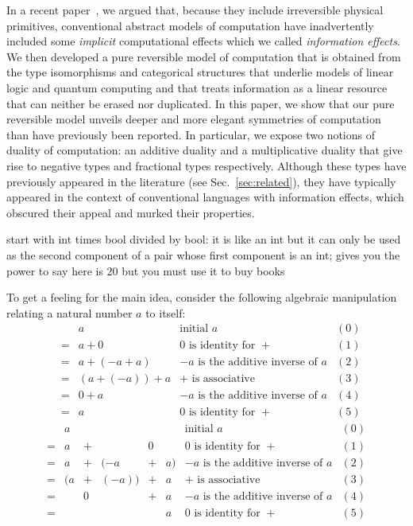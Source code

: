 \documentclass[preprint]{sigplanconf}
\begin{document}
In a recent paper~\cite{infeffects}, we argued that, because they include
irreversible physical primitives, conventional abstract models of computation
have inadvertently included some \emph{implicit} computational effects which
we called \emph{information effects}. We then developed a pure reversible
model of computation that is obtained from the type isomorphisms and
categorical structures that underlie models of linear logic and quantum
computing and that treats information as a linear resource that can neither
be erased nor duplicated. In this paper, we show that our pure reversible
model unveils deeper and more elegant symmetries of computation than have
previously been reported. In particular, we expose two notions of duality of
computation: an additive duality and a multiplicative duality that give rise
to negative types and fractional types respectively. Although these types
have previously appeared in the literature (see Sec.~\ref{sec:related}), they
have typically appeared in the context of conventional languages with
information effects, which obscured their appeal and murked their properties.

start with int times bool divided by bool: it is like an int but it can only
be used as the second component of a pair whose first component is an int;
gives you the power to say here is 20 but you must use it to buy books

To get a feeling for the main idea, consider the following algebraic
manipulation relating a natural number $a$ to itself:
\[\begin{array}{rclll}
&& a & \mbox{initial~$a$} & (0) \\
&=& a + 0 & \mbox{$0$~is~identity~for~$+$} & (1) \\
&=& a + (-a + a) & \mbox{$-a$~is~the~additive~inverse~of~$a$} & (2) \\
&=& (a + (-a)) + a & \mbox{$+$~is~associative} & (3) \\
&=& 0 + a & \mbox{$-a$~is~the~additive~inverse~of~$a$} & (4) \\
&=& a & \mbox{$0$~is~identity~for~$+$} & (5)
\end{array}\]
\[\begin{array}{rlllllllll}
 \!&\!\!  a \!&\! \!&\!       \!&\! \!&\!    \!&\! \mbox{initial~$a$} \!&\! (0) \\
=\!&\!\!  a \!&\!+\!&\!       \!&\!0\!&\!    \!&\! \mbox{$0$~is~identity~for~$+$} \!&\! (1) \\
=\!&\!\!  a \!&\!+\!&\! (-a   \!&\!+\!&\! a) \!&\! \mbox{$-a$~is~the~additive~inverse~of~$a$} \!&\! (2) \\
=\!&\!\! (a \!&\!+\!&\! (-a)) \!&\!+\!&\! a  \!&\! \mbox{$+$~is~associative} \!&\! (3) \\
=\!&\!\!    \!&\!0\!&\!       \!&\!+\!&\! a  \!&\! \mbox{$-a$~is~the~additive~inverse~of~$a$} \!&\! (4) \\
=\!&\!\!    \!&\! \!&\!       \!&\! \!&\! a  \!&\! \mbox{$0$~is~identity~for~$+$} \!&\! (5)
\end{array}\]
\end{document}
